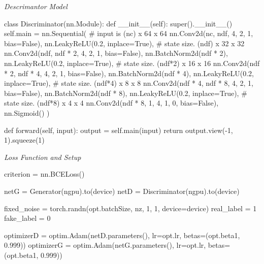 \documentclass{article}
\begin{document}
\begin{minipage}{\textwidth}
\vspace{8pt}
\emph{Descrimantor Model}
\vspace{8pt}
\begin{ipythonnb}
class Discriminator(nn.Module):
    def __init__(self):
        super().__init__()
        self.main = nn.Sequential(
            # input is (nc) x 64 x 64
            nn.Conv2d(nc, ndf, 4, 2, 1, bias=False),
            nn.LeakyReLU(0.2, inplace=True),
            # state size. (ndf) x 32 x 32
            nn.Conv2d(ndf, ndf * 2, 4, 2, 1, bias=False),
            nn.BatchNorm2d(ndf * 2),
            nn.LeakyReLU(0.2, inplace=True),
            # state size. (ndf*2) x 16 x 16
            nn.Conv2d(ndf * 2, ndf * 4, 4, 2, 1, bias=False),
            nn.BatchNorm2d(ndf * 4),
            nn.LeakyReLU(0.2, inplace=True),
            # state size. (ndf*4) x 8 x 8
            nn.Conv2d(ndf * 4, ndf * 8, 4, 2, 1, bias=False),
            nn.BatchNorm2d(ndf * 8),
            nn.LeakyReLU(0.2, inplace=True),
            # state size. (ndf*8) x 4 x 4
            nn.Conv2d(ndf * 8, 1, 4, 1, 0, bias=False),
            nn.Sigmoid()
        )

    def forward(self, input):
        output = self.main(input)
        return output.view(-1, 1).squeeze(1)
\end{ipythonnb}
\end{minipage}

\begin{minipage}{\textwidth}
\vspace{8pt}
\emph{Loss Function and Setup}
\vspace{8pt}
\begin{ipythonnb}
criterion = nn.BCELoss()

netG = Generator(ngpu).to(device)
netD = Discriminator(ngpu).to(device)

fixed_noise = torch.randn(opt.batchSize, nz, 1, 1, device=device)
real_label = 1
fake_label = 0

optimizerD = optim.Adam(netD.parameters(), lr=opt.lr, betas=(opt.beta1, 0.999))
optimizerG = optim.Adam(netG.parameters(), lr=opt.lr, betas=(opt.beta1, 0.999))
\end{ipythonnb}
\end{minipage}
\end{document}
